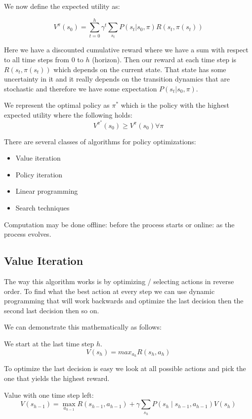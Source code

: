 \documentclass[12pt]{article}
\begin{document}
        We now define the expected utility as:
        
        $$ V^{\pi}(s_0) = \sum_{t=0}^h \gamma^t \sum_{s_t} P(s_t | s_0, \pi) R(s_t, \pi(s_t)) $$

        Here we have a discounted cumulative reward where we have a sum with respect to all time steps from 0 to $h$
        (horizon). Then our reward at each time step is $R(s_t, \pi (s_t))$ which depends on the current state. That
        state has some uncertainty in it and it really depends on the transition dynamics that are stochastic and
        therefore we have some expectation $P(s_t | s_0, \pi)$.

        We represent the optimal policy as $\pi^*$ which is the policy with the highest expected utility where the
        following holds:
        $$ V^{\pi^*} (s_0) \geq V^{\pi} (s_0) \forall \pi$$

        There are several classes of algorithms for policy optimizations:
        \begin{itemize}
            \item Value iteration
            \item Policy iteration
            \item Linear programming
            \item Search techniques
        \end{itemize}

        Computation may be done offline: before the process starts or online: as the process evolves.
    
    \subsection{Value Iteration} \label{sec:ValueIteration}
        The way this algorithm works is by optimizing / selecting actions in reverse order. To find what the best
        action at every step we can use dynamic programming that will work backwards and optimize the last decision
        then the second last decision then so on. 

        We can demonstrate this mathematically as follows:
        
        We start at the last time step $h$.
        $$ V(s_h) = max_{a_h} R(s_h, a_h) $$

        To optimize the last decision is easy we look at all possible actions and pick the one that yields the
        highest reward. 

        Value with one time step left:
        $$ V\left(s_{h-1}\right)=\max _{a_{h-1}} R\left(s_{h-1}, a_{h-1}\right)+\gamma \sum_{s_{h}}
        P(s_{h} \mid s_{h-1}, a_{h-1}) V\left(s_{h}\right) $$
\end{document}
